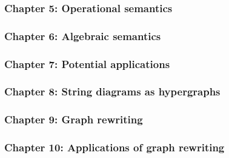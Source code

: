 \begin{frame}
    \frametitle{Chapter 5: Operational semantics}



\end{frame}

\begin{frame}
    \frametitle{Chapter 6: Algebraic semantics}



\end{frame}

\begin{frame}
    \frametitle{Chapter 7: Potential applications}



\end{frame}

\begin{frame}
    \frametitle{Chapter 8: String diagrams as hypergraphs}



\end{frame}

\begin{frame}
    \frametitle{Chapter 9: Graph rewriting}



\end{frame}

\begin{frame}
    \frametitle{Chapter 10: Applications of graph rewriting}



\end{frame}
